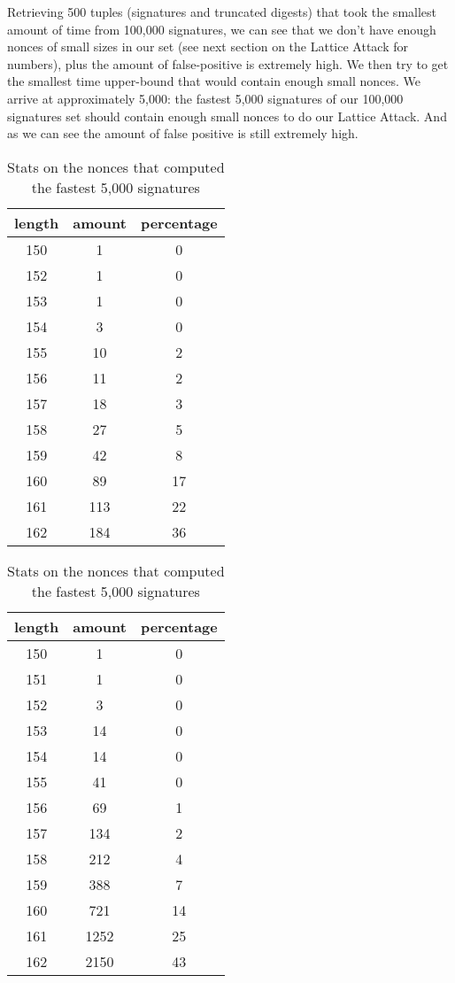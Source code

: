 \documentclass[a4paper,11pt]{article}
\begin{document}
Retrieving 500 tuples (signatures and truncated digests) that took the smallest amount of time from 100,000 signatures, we can see that we don't have enough nonces of small sizes in our set (see next section on the Lattice Attack for numbers), plus the amount of false-positive is extremely high. We then try to get the smallest time upper-bound that would contain enough small nonces. We arrive at approximately 5,000: the fastest 5,000 signatures of our 100,000 signatures set should contain enough small nonces to do our Lattice Attack. And as we can see the amount of false positive is still extremely high.

\begin{table}[H]
\parbox{.45\linewidth}{
\centering
\begin{tabular}{@{} *3c @{}}
\toprule
length&amount&percentage\\
\midrule
150  &   1   &    0\\
152  &   1  &     0\\
153  &   1  &     0\\
154  &   3  &     0\\
155  &   10  &    2\\
156  &   11  &    2\\
157   &  18  &    3\\
158  &   27 &     5\\
159  &   42 &     8\\
160  &   89  &    17\\
161  &   113 &    22\\
162  &   184 &    36\\
\bottomrule
\end{tabular}
\caption{Stats on the nonces that computed the fastest 500 signatures}
}
\hfill
\parbox{.45\linewidth}{
\centering
\begin{tabular}{@{} *3c @{}}
\toprule
length&amount&percentage\\
\midrule
150  &   1     &  0\\
151   &  1  &     0\\
152  &   3 &      0\\
153   &  14  &    0\\
154  &   14 &     0\\
155  &   41 &     0\\
156   &  69  &    1\\
157  &   134    & 2\\
158   &  212&     4\\
159   &  388 &    7\\
160  &   721 &    14\\
161  &   1252   & 25\\
162    & 2150 &   43\\
\bottomrule
\end{tabular}
\caption{Stats on the nonces that computed the fastest 5,000 signatures}
}
\end{table}
\end{document}
